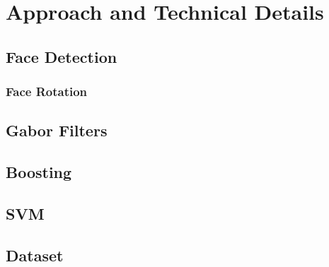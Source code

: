 
\section{Approach and Technical Details}



\subsection{Face Detection}


\subsubsection*{Face Rotation}


\subsection{Gabor Filters}


\subsection{Boosting}


\subsection{SVM}


\subsection{Dataset}


